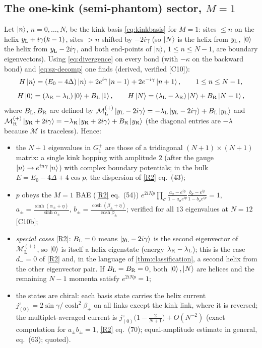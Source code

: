 \documentclass[11pt,a4paper]{article}
\theoremstyle{definition}
\newcommand{\ML}[1][s]{\mathcal M_{\mathrm L}^{(#1)}}
\newcommand{\MR}[1][s]{\mathcal M_{\mathrm R}^{(#1)}}
\newcommand{\ver}[1]{\textsf{[#1]}}   %
\begin{document}
\subsection{The one-kink (semi-phantom) sector, $M=1$}\label{sec:onekink}
Let $\ket n$, $n=0,\dots,N$, be the kink basis \eqref{eq:kinkbasis} for $M=1$: sites $\le n$ on the helix $y_{\rm L}+i\gamma(k-1)$, sites $>n$ shifted by $-2i\gamma$ (so $\ket N$ is the helix from $y_{\rm L}$, $\ket 0$ the helix from $y_{\rm L}-2i\gamma$, and both end-points of $\ket n$, $1\le n\le N-1$, are boundary eigenvectors). Using \eqref{eq:divergence} on every bond (with $-\kappa$ on the backward bond) and \eqref{eq:sz-decomp} one finds (derived, verified \ver{C10}):
\begin{equation}\label{eq:onekink}
H\ket n=(E_0-4\Delta)\ket n+2e^{i\gamma}\ket{n-1}+2e^{-i\gamma}\ket{n+1},\qquad 1\le n\le N-1,
\end{equation}
\begin{equation}
H\ket0=(\lambda_{\rm R}-\lambda_{\rm L})\ket0+B_{\rm L}\ket1,\qquad H\ket N=(\lambda_{\rm L}-\lambda_{\rm R})\ket N+B_{\rm R}\ket{N-1},
\end{equation}
where $B_{\rm L},B_{\rm R}$ are defined by $\ML[+]\ket{y_{\rm L}-2i\gamma}=-\lambda_{\rm L}\ket{y_{\rm L}-2i\gamma}+B_{\rm L}\ket{y_{\rm L}}$ and $\MR[+]\ket{y_{\rm R}+2i\gamma}=-\lambda_{\rm R}\ket{y_{\rm R}+2i\gamma}+B_{\rm R}\ket{y_{\rm R}}$ (the diagonal entries are $-\lambda$ because $\mathcal M$ is traceless). Hence:
\begin{itemize}
\item the $N+1$ eigenvalues in $G_1^+$ are those of a tridiagonal $(N+1)\times(N+1)$ matrix: a single kink hopping with amplitude $2$ (after the gauge $\ket n\to e^{in\gamma}\ket n$) with complex boundary potentials; in the bulk $E=E_0-4\Delta+4\cos p$, the dispersion of \ref{R2} eq.~(43);
\item $p$ obeys the $M=1$ BAE (\ref{R2} eq.~(54)) $e^{2iNp}\prod_{\sigma}\frac{a_\sigma-e^{ip}}{1-a_\sigma e^{ip}}\frac{b_\sigma-e^{ip}}{1-b_\sigma e^{ip}}=1$, $a_\pm=\frac{\sinh(\alpha_\pm+\eta)}{\sinh\alpha_\pm}$, $b_\pm=\frac{\cosh(\beta_\pm+\eta)}{\cosh\beta_\pm}$; verified for all $13$ eigenvalues at $N=12$ \ver{C10b};
\item \emph{special cases} \ref{R2}: $B_{\rm L}=0$ means $\ket{y_{\rm L}-2i\gamma}$ is the second eigenvector of $\ML[+]$, so $\ket0$ is itself a helix eigenstate (energy $\lambda_{\rm R}-\lambda_{\rm L}$); this is the case $d_-=0$ of \ref{R2} and, in the language of \cref{thm:classification}, a second helix from the other eigenvector pair. If $B_{\rm L}=B_{\rm R}=0$, both $\ket0,\ket N$ are helices and the remaining $N-1$ momenta satisfy $e^{2iNp}=1$;
\item the states are chiral: each basis state carries the helix current $j^z_{(0)}=2\sin\gamma/\cosh^2\beta_+$ on all links except the kink link, where it is reversed; the multiplet-averaged current is $j^z_{(0)}\big(1-\frac{2}{N+1}\big)+O(N^{-2})$ (exact computation for $a_\pm b_\pm=1$, \ref{R2} eq.~(70); equal-amplitude estimate in general, eq.~(63); quoted).
\end{itemize}
\end{document}
